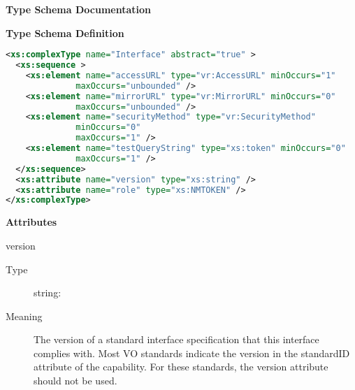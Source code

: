\documentclass[11pt,a4paper]{ivoa}
\begin{document}
\begin{generated}
\begingroup
      	\renewcommand*\descriptionlabel[1]{%
      	\hbox to 5.5em{\emph{#1}\hfil}}\vspace{2ex}\noindent\textbf{ Type Schema Documentation}




\vspace{1ex}\noindent\textbf{ Type Schema Definition}

\begin{lstlisting}[language=XML,basicstyle=\footnotesize]
<xs:complexType name="Interface" abstract="true" >
  <xs:sequence >
    <xs:element name="accessURL" type="vr:AccessURL" minOccurs="1"
              maxOccurs="unbounded" />
    <xs:element name="mirrorURL" type="vr:MirrorURL" minOccurs="0"
              maxOccurs="unbounded" />
    <xs:element name="securityMethod" type="vr:SecurityMethod"
              minOccurs="0"
              maxOccurs="1" />
    <xs:element name="testQueryString" type="xs:token" minOccurs="0"
              maxOccurs="1" />
  </xs:sequence>
  <xs:attribute name="version" type="xs:string" />
  <xs:attribute name="role" type="xs:NMTOKEN" />
</xs:complexType>
\end{lstlisting}

\vspace{0.5ex}\noindent\textbf{ Attributes}

\begingroup\small\begin{bigdescription}
\item[version]
\begin{description}
\item[Type] string: 
\item[Meaning] 
               The version of a standard interface specification that this 
               interface complies with.  Most VO standards indicate the
               version in the standardID attribute of the capability.  For
               these standards, the version attribute should not be used.
            

\end{description}
\end{bigdescription}
\end{generated}
\end{document}
